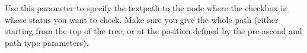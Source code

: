 

Use this parameter to specify the textpath to the node where the checkbox is whose status you want to check. Make sure you give the whole path (either starting from the top of the tree, or at the position defined by the pre-ascend and path type parameters).



